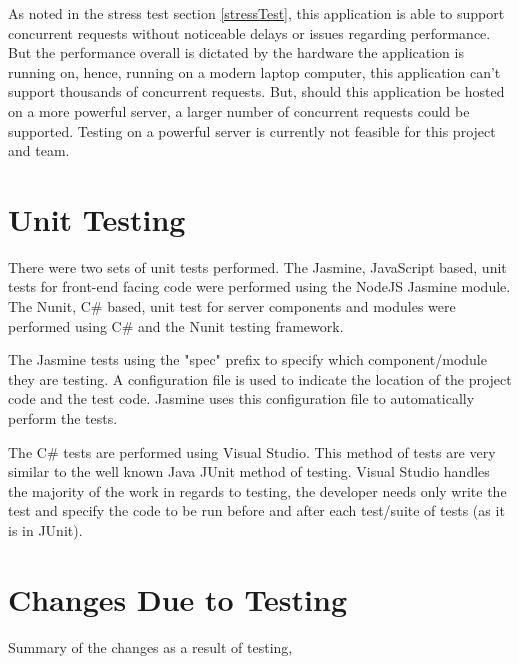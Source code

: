 \documentclass[12pt, titlepage]{article}
\begin{document}
As noted in the stress test section \ref{stressTest}, this application is able
to support concurrent requests without noticeable delays or issues regarding
performance. But the performance overall is dictated by the hardware the
application is running on, hence, running on a modern laptop computer, this
application can't support thousands of concurrent requests. But, should this
application be hosted on a more powerful server, a larger number of concurrent
requests could be supported. Testing on a powerful server is currently not
feasible for this project and team.

\section{Unit Testing}
There were two sets of unit tests performed. The Jasmine, JavaScript based,
unit tests for front-end facing code were performed using the NodeJS Jasmine
module. The Nunit, C\# based, unit test for server components and modules were
performed using C\# and the Nunit testing framework.

The Jasmine tests using the "spec" prefix to specify which component/module
they are testing. A configuration file is used to indicate the location of the
project code and the test code. Jasmine uses this configuration file to
automatically perform the tests.

The C\# tests are performed using Visual Studio. This method of tests are very
similar to the well known Java JUnit method of testing. Visual Studio handles
the majority of the work in regards to testing, the developer needs only write
the test and specify the code to be run before and after each test/suite of
tests (as it is in JUnit).

\section{Changes Due to Testing}

Summary of the changes as a result of testing,
\end{document}
